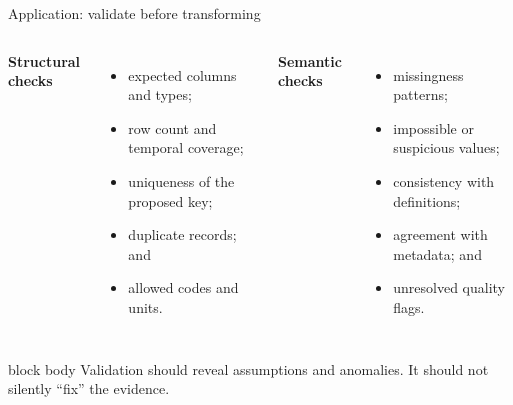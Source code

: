 \documentclass[10pt,aspectratio=169]{beamer}
\begin{document}
\begin{frame}{Application: validate before transforming}

\small

\begin{columns}[T]


\textbf{Structural checks}

\begin{itemize}
  \item expected columns and types;
  \item row count and temporal coverage;
  \item uniqueness of the proposed key;
  \item duplicate records; and
  \item allowed codes and units.
\end{itemize}


\textbf{Semantic checks}

\begin{itemize}
  \item missingness patterns;
  \item impossible or suspicious values;
  \item consistency with definitions;
  \item agreement with metadata; and
  \item unresolved quality flags.
\end{itemize}

\end{columns}

\vspace{0.35cm}

\begin{beamercolorbox}[rounded=true,sep=8pt]{block body}
Validation should reveal assumptions and anomalies. It should not silently ``fix'' the evidence.
\end{beamercolorbox}

\end{frame}
\end{document}
